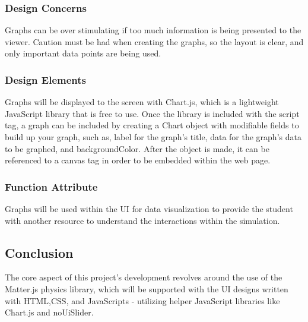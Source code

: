 \documentclass[onecolumn, draftclsnofoot,10pt, compsoc]{IEEEtran}
\begin{document}
\subsubsection{Design Concerns}
Graphs can be over stimulating if too much information is being presented to the viewer. Caution must be had when creating the graphs, so the layout is clear, and only important data points are being used.

\subsubsection{Design Elements}
 Graphs will be displayed to the screen with Chart.js, which is a lightweight JavaScript library that is free to use. Once the library is included with the script tag, a graph can be included by creating a Chart object with modifiable fields to build up your graph, such as, label for the graph's title, data for the graph's data to be graphed, and backgroundColor. After the object is made, it can be referenced to a canvas tag in order to be embedded within the web page.

\subsubsection{Function Attribute}
Graphs will be used within the UI for data visualization to provide the student with another resource to understand the interactions within the simulation.


\subsection{Conclusion}
The core aspect of this project's development revolves around the use of the Matter.js physics library, which will be supported with the UI designs written with HTML,CSS, and JavaScripts - utilizing helper JavaScript libraries like Chart.js and noUiSlider. 
\end{document}
